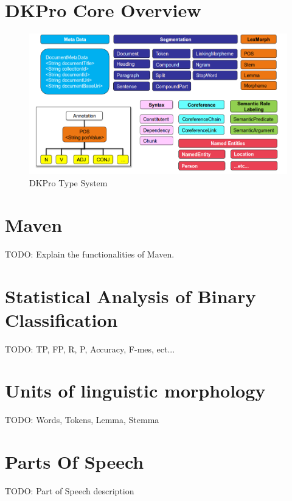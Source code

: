 \chapter{DKPro Core Overview}
\begin{figure}[ht]
    \centering
    \includegraphics[width=1\textwidth]{fig/dkpro-overview.png}
    \caption[Short caption]{DKPro Type System}
    \label{fig:dkpro-overview}
\end{figure}
\label{sec:dkpro overview}

\chapter{Maven}
\label{sec:maven}
TODO: Explain the functionalities of Maven.

\chapter{Statistical Analysis of Binary Classification}
\label{sec:stanabin}
TODO: TP, FP, R, P, Accuracy, F-mes, ect...

\chapter{Units of linguistic morphology}
\label{sec:linmorph}
TODO: Words, Tokens, Lemma, Stemma

\chapter{Parts Of Speech}
\label{sec:pos}
TODO: Part of Speech description